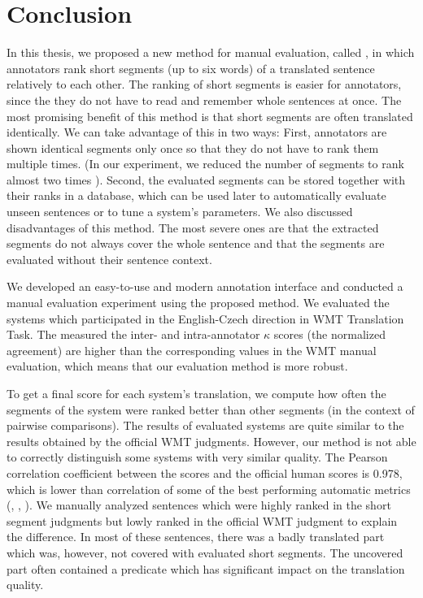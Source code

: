 \chapter{Conclusion}
\label{chapter:conclusion}

In this thesis, we proposed a new method for manual evaluation, called
, in which annotators rank short segments (up to six words) of
a translated sentence relatively to each other. The ranking of short segments
is easier for annotators, since the they do not have to read and remember whole
sentences at once. The most promising benefit of this method is that short
segments are often translated identically.  We can take advantage of this in
two ways: First, annotators are shown identical segments only once so that they
do not have to rank them multiple times. (In our experiment, we reduced the
number of segments to rank almost two times ). Second,
the evaluated segments can be stored together with their ranks in a database,
which can be used later to automatically evaluate unseen sentences or to tune a
system's parameters. We also discussed disadvantages of this method. The most
severe ones are that the extracted segments do not always cover the whole
sentence and that the segments are evaluated without their sentence context.

We developed an easy-to-use and modern annotation interface and conducted a
manual evaluation experiment using the proposed method. We evaluated the
systems which participated in the English-Czech direction in WMT Translation
Task. The measured the inter- and intra-annotator $\kappa$ scores (the
normalized agreement) are higher than the corresponding values in the WMT
manual evaluation, which means that our evaluation method is more robust.

To get a final score for each system's translation, we compute how often the
segments of the system were ranked better than other segments (in the context
of pairwise comparisons).  The results of evaluated systems are quite similar
to the results obtained by the official WMT judgments. However, our method is
not able to correctly distinguish some systems with very similar quality. The
Pearson correlation coefficient between the  scores and the
official human scores is 0.978, which is lower than correlation of some of the
best performing automatic metrics (, ,
). We manually analyzed sentences which were highly ranked in the
short segment judgments but lowly ranked in the official WMT judgment to
explain the difference. In most of these sentences, there was a badly
translated part which was, however, not covered with evaluated short segments.
The uncovered part often contained a predicate which has significant impact on
the translation quality. 

